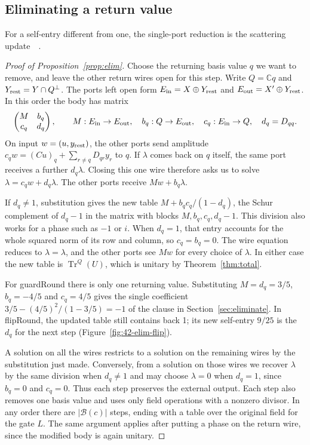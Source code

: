 \documentclass[acmsmall,screen,review,anonymous,nonacm]{acmart}
\newcommand{\C}{\mathbb C}
\newcommand{\storyinlineface}{\small\ttfamily}
\newcommand{\code}[1]{\textnormal{\storyinlineface #1}}
\DeclareMathOperator{\Tr}{Tr}
\numberwithin{equation}{section}
\begin{document}
\subsection{Eliminating a return value}\label{app:elim}
For a self-entry different from one, the single-port reduction is the scattering
update~\cite[\S~4, Thm.~12]{GoughJames09Feedback}~\cite[App.~A, Eq.~(A1)]{Tezak12QHDL}.
\begin{proof}[Proof of Proposition~\ref{prop:elim}]
\setlength{\parindent}{\appendixindent}
Choose the returning basis value $q$ we want to remove, and leave the
other return wires open for this step. Write $Q=\C q$ and
$Y_{\rm rest}=Y\cap Q^\perp$. The ports left open form
$E_{\rm in}=X\oplus Y_{\rm rest}$ and $E_{\rm out}=X'\oplus Y_{\rm rest}$.
In this order the body has matrix
\[
 \begin{pmatrix}M&b_q\\c_q&d_q\end{pmatrix},\qquad
 M:E_{\rm in}\to E_{\rm out},\quad b_q:Q\to E_{\rm out},\quad
 c_q:E_{\rm in}\to Q,\quad d_q=D_{qq}.
\]
On input $w=(u,y_{\rm rest})$, the other ports send amplitude
$c_qw=(Cu)_q+\sum_{r\ne q}D_{qr}y_r$ to $q$. If $\lambda$ comes
back on $q$ itself, the same port receives a further $d_q\lambda$.
Closing this one wire therefore asks us to solve
$\lambda=c_qw+d_q\lambda$. The other ports receive $Mw+b_q\lambda$.

If $d_q\ne1$, substitution gives the new table
$M+b_qc_q/(1-d_q)$, the Schur complement of $d_q-1$ in the
matrix with blocks $M,b_q,c_q,d_q-1$. This division also works for a phase such as
$-1$ or $i$. When $d_q=1$, that entry accounts for the whole squared norm of its
row and column, so $c_q=b_q=0$. The wire equation reduces to
$\lambda=\lambda$, and the other ports see $Mw$ for every choice of $\lambda$.
In either case the new table is $\Tr^Q(U)$, which is unitary by
Theorem~\ref{thm:total}.

For \code{guardRound} there is only one returning value. Substituting
$M=d_q=3/5$, $b_q=-4/5$ and $c_q=4/5$ gives the single coefficient
$3/5-(4/5)^2/(1-3/5)=-1$ of the clause in Section~\ref{sec:eliminate}.
In \code{flipRound}, the updated table still contains \code{back 1};
its new self-entry $9/25$ is the $d_q$ for the next step
(Figure~\ref{fig:42-elim-flip}).

A solution on all the wires restricts to a solution on the remaining
wires by the substitution just made. Conversely, from a solution on
those wires we recover $\lambda$ by the same division when $d_q\ne1$
and may choose $\lambda=0$ when $d_q=1$, since $b_q=0$ and $c_q=0$. Thus each step preserves
the external output. Each step also removes one basis value and uses
only field operations with a nonzero divisor. In any order there are
$|\mathcal B(c)|$ steps, ending with a table over the original field
for the gate $L$. The same argument applies after putting a phase on
the return wire, since the modified body is again unitary.
\end{proof}
\end{document}
